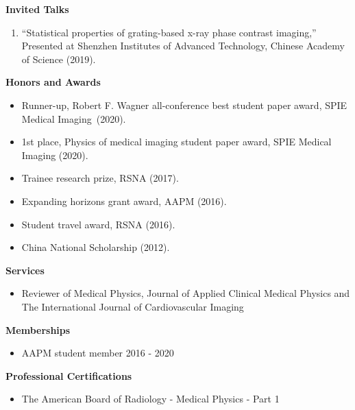 \documentclass[letterpaper,11pt]{article}
\newcommand{\resheading}[1]{{\large \colorbox{mygrey}{\begin{minipage}{\textwidth}{\textbf{#1 \vphantom{p\^{E}}}}\end{minipage}}}}
\begin{document}
\resheading {Invited Talks}
\begin{enumerate}\justifying
\item ``Statistical properties of grating-based x-ray phase contrast imaging,'' Presented at Shenzhen Institutes of Advanced Technology, Chinese Academy of Science (2019).
\end{enumerate}
\resheading{{Honors and Awards}}
\begin{itemize}\justifying
\item Runner-up, Robert F. Wagner all-conference best student paper award, SPIE Medical Imaging~(2020).
\item 1st place, Physics of medical imaging student paper award, SPIE Medical Imaging (2020).
\item Trainee research prize, RSNA (2017).
\item Expanding horizons grant award, AAPM (2016).
\item Student travel award, RSNA (2016).
\item China National Scholarship (2012).
\end{itemize}
\resheading{Services}
\begin{itemize}
\item Reviewer of Medical Physics, Journal of Applied Clinical Medical Physics and The International Journal of Cardiovascular Imaging
\end{itemize}
\resheading{Memberships}
\begin{itemize}
\item AAPM student member \cftdotfill{\cftdotsep} 2016 - 2020
\end{itemize}
\resheading{Professional Certifications}
\begin{itemize}
\item The American Board of Radiology - Medical Physics - Part 1
\end{itemize}
\end{document}
